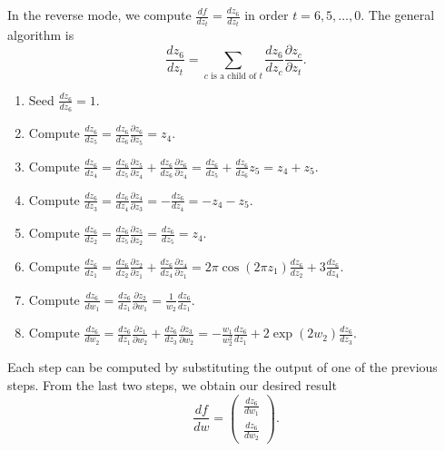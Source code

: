 \documentclass[letterpaper,11pt]{article}
\begin{document}
In the reverse mode, we compute $\frac{df}{dz_t} = \frac{dz_6}{dz_t}$ in order
$t = 6,5,\ldots,0$. The general algorithm is
\begin{equation}
  \frac{dz_6}{dz_t} = \sum_{\text{$c$ is a child of $t$}}
  \frac{dz_6}{dz_c}
  \frac{\partial z_c}{\partial z_t}.
\end{equation}

\begin{enumerate}
\item Seed $\displaystyle \frac{dz_6}{dz_6} = 1$.
\item Compute
  $\displaystyle \frac{dz_6}{dz_5} =
  \frac{dz_6}{dz_6}\frac{\partial z_6}{\partial z_5} = z_4$.
\item Compute
  $\displaystyle \frac{dz_6}{dz_4} = \frac{dz_6}{d z_5}\frac{\partial
    z_5}{\partial z_4} + \frac{d z_6}{d z_6}\frac{\partial z_6}{\partial z_4} =
  \frac{dz_6}{d z_5} + \frac{d z_6}{d z_6}z_5
  =
  z_4 + z_5
  $.
\item Compute
  $\displaystyle \frac{dz_6}{dz_3} = \frac{dz_6}{d z_4}\frac{\partial
    z_4}{\partial z_3} = -\frac{dz_6}{d z_4} = -z_4 - z_5$.
\item Compute
  $\displaystyle \frac{dz_6}{dz_2} = \frac{dz_6}{d z_5}\frac{\partial
    z_5}{\partial z_2} = \frac{dz_6}{d z_5} = z_4$.
\item Compute
  $\displaystyle \frac{dz_6}{dz_1} =
  \frac{dz_6}{d z_2}\frac{\partial  z_2}{\partial z_1} +
  \frac{dz_6}{d z_4}\frac{\partial  z_4}{\partial z_1} =
  2\pi\cos\left(2\pi z_1\right)\frac{dz_6}{d z_2} +
  3\frac{dz_6}{d z_4}$.
\item Compute
  $\displaystyle
  \frac{dz_6}{dw_1} = \frac{dz_6}{dz_1}\frac{\partial z_2}{\partial w_1}
  = \frac{1}{w_2}\frac{dz_6}{dz_1}$.
\item Compute
  $\displaystyle
  \frac{dz_6}{dw_2} = \frac{dz_6}{dz_1}\frac{\partial z_1}{\partial w_2} +
  \frac{dz_6}{dz_3}\frac{\partial z_3}{\partial w_2}
  = -\frac{w_1}{w_2^2}\frac{dz_6}{dz_1} + 2\exp\left(2w_2\right)\frac{dz_6}{dz_3}$.
\end{enumerate}

Each step can be computed by substituting the output of one of the previous
steps. From the last two steps, we obtain our desired result
\begin{equation}
  \boxed{
    \frac{df}{dw} = \begin{pmatrix}
      \displaystyle\frac{dz_6}{dw_1} \\ \displaystyle\frac{dz_6}{dw_2}
    \end{pmatrix}.
  }
\end{equation}
\end{document}
